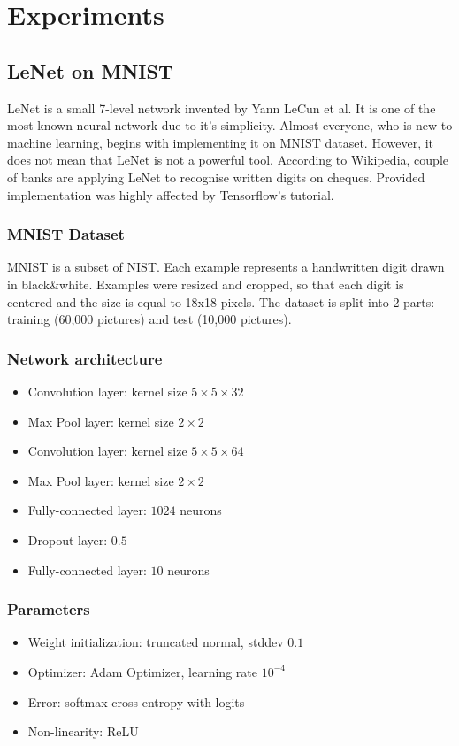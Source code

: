 \documentclass[licencjacka]{pracamgr}
\begin{document}
\chapter{Experiments}
	\section{LeNet on MNIST}
		LeNet is a small 7-level network invented by Yann LeCun et al. It is one of the most known neural network due to it’s simplicity. Almost everyone, who is new to machine learning, begins with implementing it on MNIST dataset. However, it does not mean that LeNet is not a powerful tool. According to Wikipedia, couple of banks are applying LeNet to recognise written digits on cheques. Provided implementation was highly affected by Tensorflow's tutorial. \\
		\subsection{MNIST Dataset}
			MNIST is a subset of NIST. Each example represents a handwritten digit drawn in black&white. Examples were resized and cropped, so that each digit is centered and the size is equal to 18x18 pixels. The dataset is split into 2 parts: training (60,000 pictures) and test (10,000 pictures).

		\subsection{Network architecture}
			\begin{itemize}
			\item Convolution layer: kernel size $5 \times 5 \times 32$
			\item Max Pool layer: kernel size $2 \times 2$
			\item Convolution layer: kernel size $5 \times 5 \times 64$
			\item Max Pool layer: kernel size $2 \times 2$
			\item Fully-connected layer: $1024$ neurons
			\item Dropout layer: $0.5$
			\item Fully-connected layer: $10$ neurons
			\end{itemize}
		\subsection{Parameters}
			\begin{itemize}
			\item Weight initialization: truncated normal, stddev $0.1$
			\item Optimizer: Adam Optimizer, learning rate $10^{-4}$
			\item Error: softmax cross entropy with logits
			\item Non-linearity: ReLU
			\end{itemize}
\end{document}
